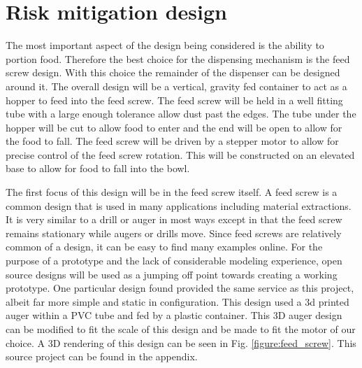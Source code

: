 \documentclass[12pt]{article}
\newcounter{engineering}
\begin{document}
\section{Risk mitigation design}
The most important aspect of the design being considered is the ability to portion food. Therefore the best choice for the dispensing mechanism is the feed screw design. With this choice the remainder of the dispenser can be designed around it. The overall design will be a vertical, gravity fed container to act as a hopper to feed into the feed screw. The feed screw will be held in a well fitting tube with a large enough tolerance allow dust past the edges. The tube under the hopper will be cut to allow food to enter and the end will be open to allow for the food to fall. The feed screw will be driven by a stepper motor to allow for precise control of the feed screw rotation. This will be constructed on an elevated base to allow for food to fall into the bowl.

The first focus of this design will be in the feed screw itself. A feed screw is a common design that is used in many applications including material extractions. It is very similar to a drill or auger in most ways except in that the feed screw remains stationary while augers or drills move. Since feed screws are relatively common of a design, it can be easy to find many examples online. For the purpose of a prototype and the lack of considerable modeling experience, open source designs will be
used as a jumping off point towards creating a working prototype. One particular design found provided the same service as this project, albeit far more simple and static in configuration. This design used a 3d printed auger within a PVC tube and fed by a plastic container. This 3D auger design can be modified to fit the scale of this design and be made to fit the motor of our choice. A 3D rendering of this design can be seen in Fig. \ref{figure:feed_screw}. This source project can be found in the appendix. 
\end{document}

